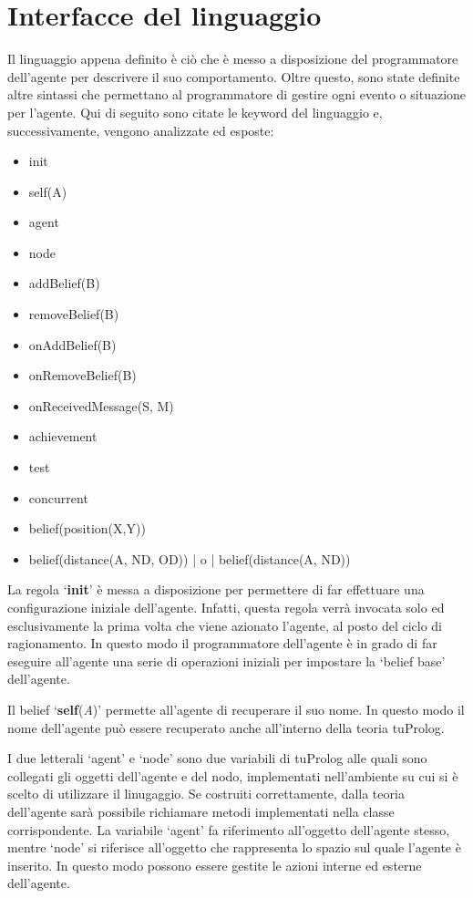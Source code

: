 \section{Interfacce del linguaggio}
Il linguaggio appena definito \`e ci\`o che \`e messo a disposizione del programmatore dell'agente per descrivere il suo comportamento. Oltre questo, sono state definite altre sintassi che permettano al programmatore di gestire ogni evento o situazione per l'agente. 
Qui di seguito sono citate le keyword del linguaggio e, successivamente, vengono analizzate ed esposte:
\begin{itemize}
\item init
\item self(A)
\item agent
\item node
\item addBelief(B)
\item removeBelief(B)
\item onAddBelief(B)
\item onRemoveBelief(B)
\item onReceivedMessage(S, M)
\item achievement
\item test
\item concurrent
\item belief(position(X,Y))
\item belief(distance(A, ND, OD)) | o |  belief(distance(A, ND))
\end{itemize}

La regola `\textbf{init}' \`e messa a disposizione per permettere di far effettuare una configurazione iniziale dell'agente. Infatti, questa regola verr\`a invocata solo ed esclusivamente la prima volta che viene azionato l'agente, al posto del ciclo di ragionamento. In questo modo il programmatore dell'agente \`e in grado di far eseguire all'agente una serie di operazioni iniziali per impostare la `belief base' dell'agente.

\medskip
Il belief `\textbf{self}(\textit{A})' permette all'agente di recuperare il suo nome. In questo modo il nome dell'agente pu\`o essere recuperato anche all'interno della teoria tuProlog.

\medskip
I due letterali `agent' e `node' sono due variabili di tuProlog alle quali sono collegati gli oggetti dell'agente e del nodo, implementati nell'ambiente su cui si \`e scelto di utilizzare il linugaggio. Se costruiti correttamente, dalla teoria dell'agente sar\`a possibile richiamare metodi implementati nella classe corrispondente. La variabile `agent' fa riferimento all'oggetto dell'agente stesso, mentre `node' si riferisce all'oggetto che rappresenta lo spazio sul quale l'agente \`e inserito. In questo modo possono essere gestite le azioni interne ed esterne dell'agente.

